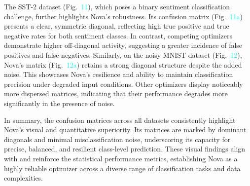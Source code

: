 \documentclass[10pt,twocolumn]{article}
\begin{document}
The SST-2 dataset (Fig.~\textcolor{cyan}{11}), which poses a binary sentiment classification challenge, further highlights Nova’s robustness. Its confusion matrix (Fig.~\textcolor{cyan}{11a}) presents a clear, symmetric diagonal, reflecting high true positive and true negative rates for both sentiment classes. In contrast, competing optimizers demonstrate higher off-diagonal activity, suggesting a greater incidence of false positives and false negatives. Similarly, on the noisy MNIST dataset (Fig.~\textcolor{cyan}{12}), Nova’s matrix (Fig.~\textcolor{cyan}{12a}) retains a strong diagonal structure despite the added noise. This showcases Nova’s resilience and ability to maintain classification precision under degraded input conditions. Other optimizers display noticeably more dispersed matrices, indicating that their performance degrades more significantly in the presence of noise.

In summary, the confusion matrices across all datasets consistently highlight Nova’s visual and quantitative superiority. Its matrices are marked by dominant diagonals and minimal misclassification noise, underscoring its capacity for precise, balanced, and resilient class-level prediction. These visual findings align with and reinforce the statistical performance metrics, establishing Nova as a highly reliable optimizer across a diverse range of classification tasks and data complexities.
\end{document}
